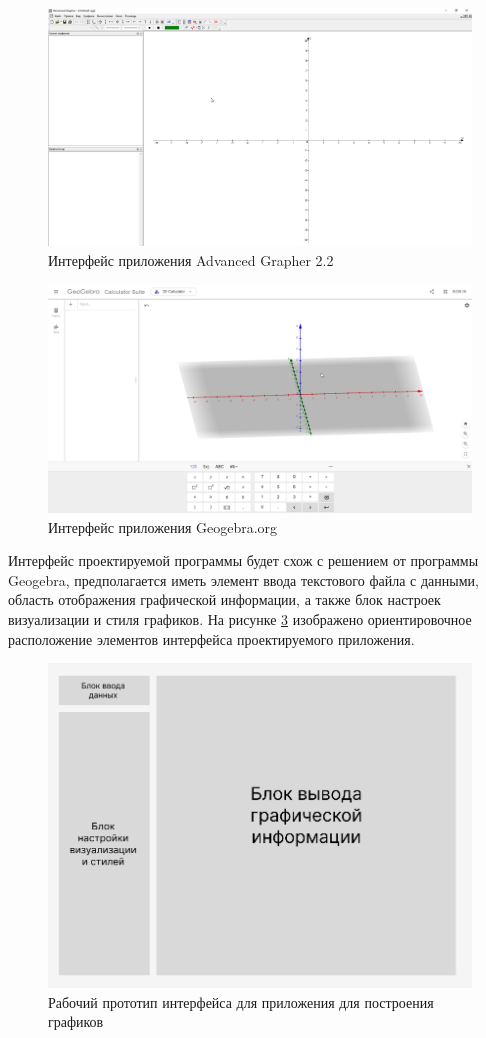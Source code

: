 \begin{figure}[h!]
    \center
    \includegraphics[scale=0.3]{fig/adgrapher.png}
    \caption{Интерфейс приложения Advanced Grapher 2.2}
    \label{fig:8}
\end{figure}

\begin{figure}[h!]
    \center
    \includegraphics[scale=0.3]{fig/Geogebra.png}
    \caption{Интерфейс приложения Geogebra.org}
    \label{fig:9}
\end{figure}

Интерфейс проектируемой программы будет схож с решением от программы Geogebra, предполагается иметь элемент ввода текстового файла с данными, область отображения графической информации, а также блок настроек визуализации и стиля графиков. На рисунке \ref{fig:10} изображено ориентировочное расположение элементов интерфейса проектируемого приложения.

\begin{figure}[h!]
    \center
    \includegraphics[scale=0.7]{fig/interface.png}
    \caption{Рабочий прототип интерфейса для приложения для построения графиков}
    \label{fig:10}
\end{figure}